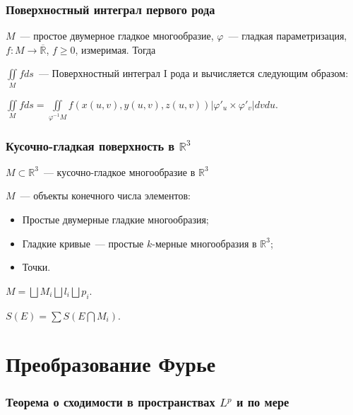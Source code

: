 \documentclass{article}
\begin{document}
    \section{Поверхностный интеграл первого рода}
        
        $M$~--- простое двумерное гладкое многообразие, $\varphi$~--- гладкая параметризация, $f : M \rightarrow \overline{\mathbb{R}}$, $f \geqslant 0$, измеримая. Тогда
        
        $\iint\limits_M f ds$~--- Поверхностный интеграл $\mathrm{I}$ рода и вычисляется следующим образом:
        
        $\iint\limits_M f ds = \iint\limits_{\varphi^{-1} M} f(x(u, v), y(u, v), z(u, v)) | \varphi'_u \times \varphi'_v | dv du$.
        
    \newpage
    
    \section{Кусочно-гладкая поверхность в $\mathbb{R}^3$}
    
        $M \subset \mathbb{R}^3$~--- кусочно-гладкое многообразие в $\mathbb{R}^3$
        
        $M$~--- объекты конечного числа элементов:
        
        \begin{itemize}
        
            \item Простые двумерные гладкие многообразия;
            
            \item Гладкие кривые~--- простые $k$-мерные многообразия в $\mathbb{R}^3$;
            
            \item Точки.
            
        \end{itemize}
        
        $M = \bigsqcup M_i \bigsqcup l_i \bigsqcup p_i$.
        
        $S(E) = \sum S(E \bigcap M_i)$.
        
\newpage

\part{Преобразование Фурье}

    \section{Теорема о сходимости в пространствах $L^p$ и по мере}
    
\end{document}
